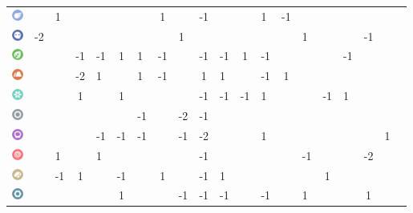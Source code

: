 \begin{table}[h]
\begin{center}
\begin{tabular}{c c g c g c g c g c g c g c g c g c g c}
    \includegraphics[width=1em]{images/flying.png} & & 1 & & & & & 1 & & -1 & & & 1 & -1 & & & & & \\
    \includegraphics[width=1em]{images/ghost.png} & -2 & & & & & & & 1 & & & & & & 1 & & & -1 & \\
    \includegraphics[width=1em]{images/grass.png} & & & -1 & -1 & 1 & 1 & -1 & & -1 & -1 & 1 & -1 & & & & -1 & & \\
    \includegraphics[width=1em]{images/ground.png} & & & -2 & 1 & & 1 & -1 & & 1 & 1 & & -1 & 1 & & & & & \\
    \includegraphics[width=1em]{images/ice.png} & & & 1 & & 1 & & & & -1 & -1 & -1 & 1 & & & -1 & 1 & & \\
    \includegraphics[width=1em]{images/normal.png} & & & & & & -1 & & -2 & -1 & & & & & & & & & \\
    \includegraphics[width=1em]{images/poison.png} & & & & -1 & -1 & -1 & & -1 & -2 & & & 1 & & & & & & 1 \\
    \includegraphics[width=1em]{images/psychic.png} & & 1 & & 1 & & & & & -1 & & & & & -1 & & & -2 & &  \\
    \includegraphics[width=1em]{images/rock.png} & & -1 & 1 & & -1 & & 1 & & -1 & 1 & & & & & 1 & & & \\
    \includegraphics[width=1em]{images/steel.png} & & & & & 1 & & & -1 & -1 & -1 & & -1 & & 1 & & & 1 & \\

\end{tabular}
\end{center}
\end{table}
